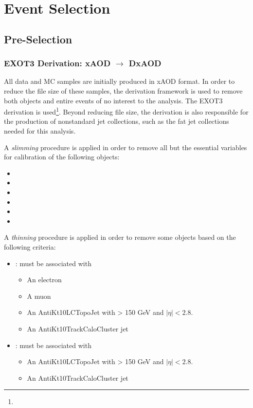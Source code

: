 \section{Event Selection}
\label{sec:selection}

\subsection{Pre-Selection}
\label{subsec:presel}

\subsubsection{EXOT3 Derivation: xAOD $\rightarrow$ DxAOD}
\label{subsec:exot3}

All data and MC samples are initially produced in xAOD format.
In order to reduce the file size of these samples, the derivation framework is used to remove both objects and entire events of no interest to the analysis.
The EXOT3 derivation is used\footnote{}.
Beyond reducing file size, the derivation is also responsible for the production of nonstandard jet collections, such as the fat jet collections needed for this analysis.

A \textit{slimming} procedure is applied in order to remove all but the essential variables for calibration of the following objects:
\begin{itemize}
    \item {}
    \item {}
    \item {}
    \item {}
    \item {}
    \item {}
\end{itemize}

A \textit{thinning} procedure is applied in order to remove some objects based on the following criteria:

\begin{itemize}
    \item {}: must be associated with
    \begin{itemize}
        \item An electron
        \item A muon
        \item An AntiKt10LCTopoJet with \pt > 150 GeV and $|\eta| < 2.8$.
        \item An AntiKt10TrackCaloCluster jet
    \end{itemize}
    \item {}: must be associated with
    \begin{itemize}
        \item An AntiKt10LCTopoJet with \pt > 150 GeV and $|\eta| < 2.8$.
        \item An AntiKt10TrackCaloCluster jet
    \end{itemize}
\end{itemize}

